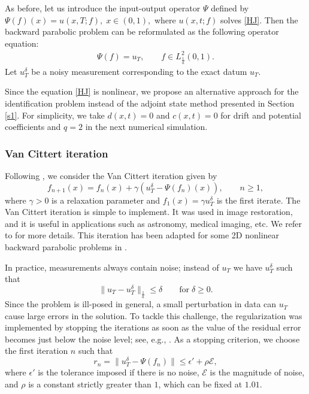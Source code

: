 \documentclass[reqno]{amsart}
\theoremstyle{plain}
\theoremstyle{remark}
\numberwithin{equation}{section}
\begin{document}
As before, let us introduce the input-output operator $\Psi$ defined by
$\Psi(f)(x)=u(x,T;f), \; x\in (0,1),$
where $u(x,t;f)$ solves \eqref{HJ}. Then
the backward parabolic problem can be reformulated as the following operator equation:
\begin{align}
    \Psi(f)=u_{T}, \qquad f\in L^2_{\frac{1}{a}}(0,1). 
\end{align}
Let $u^{\delta}_T$ be a noisy measurement corresponding to the exact datum $u_T$.

Since the equation \eqref{HJ} is nonlinear, we propose an alternative approach for the identification problem instead of the adjoint state method presented in Section \ref{s1}. For simplicity, we take $d(x,t)=0$ and $c(x,t)=0$ for drift and potential coefficients and $q=2$ in the next numerical simulation.\\
\subsubsection{\textbf{Van Cittert iteration}}
Following \cite{Carasso}, we consider the Van Cittert iteration \cite{Van} given by
\begin{equation}\label{vancittert}
    f_{n+1}(x)=f_{n}(x)+\gamma \left(u_T^\delta -\Psi(f_{n})(x)\right), \qquad n\geqslant 1,
\end{equation}
where $\gamma>0$ is a relaxation parameter and $f_1(x)=\gamma u^{\delta}_T$ is the first iterate. The Van Cittert iteration is simple to implement. It was used in image restoration, and it is useful in applications such as astronomy, medical imaging, etc. We refer to \cite[Chapter 4]{LB91} for more details. This iteration has been adapted for some 2D nonlinear backward parabolic problems in \cite{Car13}.

In practice, measurements always contain noise; instead of $u_T$ we have $u_T^\delta$ such that 
$$\|u_T-u_T^\delta\|_\frac{1}{a}\leqslant \delta \qquad \text{for}\; \delta \geqslant 0.$$
Since the problem is ill-posed in general, a small perturbation in data can $u_T$ cause large errors in the solution. To tackle this challenge, the regularization was implemented by stopping the iterations as soon as the value of the residual error becomes just below the noise level; see, e.g., \cite{Alifanov2012,cao2019determination, cao2020simultaneous,Ozisik2000}. As a stopping criterion, we choose the first iteration $n$ such that
$$r_n=\|u_T^\delta-\Psi(f_n)\|\leqslant \epsilon'+\rho \mathcal{E},$$
where $\epsilon'$ is the tolerance imposed if there is no noise, $\mathcal{E}$ is the magnitude of noise, and $\rho$ is a constant strictly greater than $1$, which can be fixed at $1.01$.
\end{document}
